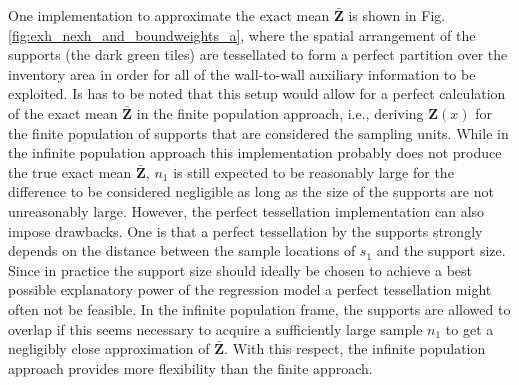 \documentclass[article]{jss}
\begin{document}
One implementation to approximate the exact mean $\bar{\pmb{Z}}$ is shown in Fig. \ref{fig:exh_nexh_and_boundweights_a}, where the spatial arrangement of the supports (the dark green tiles) are tessellated to form a perfect partition over the inventory area in order for all of the wall-to-wall auxiliary information to be exploited. Is has to be noted that this setup would allow for a perfect calculation of the exact mean $\bar{\pmb{Z}}$ in the finite population approach, i.e., deriving $\pmb{Z}(x)$ for the finite population of supports that are considered the sampling units. While in the infinite population approach this implementation probably does not produce the true exact mean $\bar{\pmb{Z}}$, $n_1$ is still expected to be reasonably large for the difference to be considered negligible as long as the size of the supports are not unreasonably large. However, the perfect tessellation implementation can also impose drawbacks. One is that a perfect tessellation by the supports strongly depends on the distance between the sample locations of $s_1$ and the support size. Since in practice the support size should ideally be chosen to achieve a best possible explanatory power of the regression model \citep{hill2018} a perfect tessellation might often not be feasible. In the infinite population frame, the supports are allowed to overlap if this seems necessary to acquire a sufficiently large sample $n_1$ to get a negligibly close approximation of $\bar{\pmb{Z}}$. With this respect, the infinite population approach provides more flexibility than the finite approach. 
\end{document}
